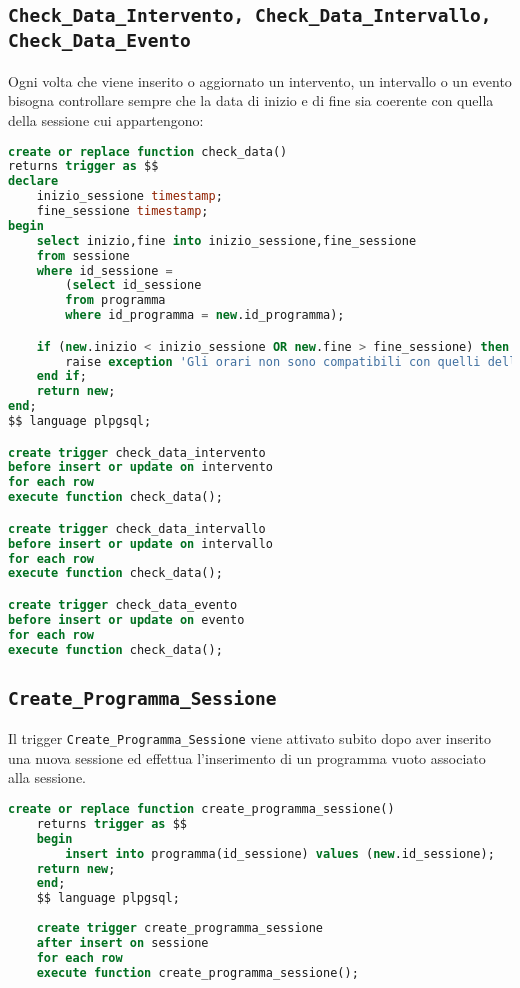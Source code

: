 \subsection{\texttt{Check\_Data\_Intervento, Check\_Data\_Intervallo, Check\_Data\_Evento}}\label{trigger:check_data}
Ogni volta che viene inserito o aggiornato un intervento, un intervallo o un evento bisogna controllare sempre che la data di inizio e di fine sia coerente con quella della sessione cui appartengono:
\begin{lstlisting}[caption={check\_data\_intervento},language=SQL,style=mystyle]
create or replace function check_data() 
returns trigger as $$
declare
	inizio_sessione timestamp;
	fine_sessione timestamp;
begin
	select inizio,fine into inizio_sessione,fine_sessione
	from sessione
	where id_sessione = 
		(select id_sessione 
		from programma 
		where id_programma = new.id_programma);

	if (new.inizio < inizio_sessione OR new.fine > fine_sessione) then
		raise exception 'Gli orari non sono compatibili con quelli della sessione';
	end if;
	return new;
end;
$$ language plpgsql;

create trigger check_data_intervento
before insert or update on intervento
for each row
execute function check_data();

create trigger check_data_intervallo
before insert or update on intervallo
for each row
execute function check_data();

create trigger check_data_evento
before insert or update on evento
for each row
execute function check_data();
\end{lstlisting}
\subsection{\texttt{Create\_Programma\_Sessione}}
Il trigger \texttt{Create\_Programma\_Sessione} viene attivato subito dopo aver inserito una nuova sessione ed effettua l'inserimento di un programma vuoto associato alla sessione.
\begin{lstlisting}[language=SQL, caption={\texttt{create\_programma\_sessione}},style=mystyle]
	create or replace function create_programma_sessione() 
	returns trigger as $$
	begin
		insert into programma(id_sessione) values (new.id_sessione);
	return new;
	end;
	$$ language plpgsql;
	
	create trigger create_programma_sessione
	after insert on sessione
	for each row
	execute function create_programma_sessione();
\end{lstlisting}
